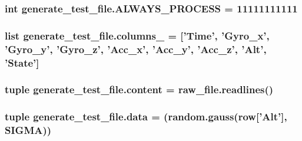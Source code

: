 \hypertarget{namespacegenerate__test__file_a063f15b4ec460755dbe0da62cdd3f591}{
\subsubsection[{A\-L\-W\-A\-Y\-S\-\_\-\-P\-R\-O\-C\-E\-S\-S}]{\setlength{\rightskip}{0pt plus 5cm}int generate\-\_\-test\-\_\-file.\-A\-L\-W\-A\-Y\-S\-\_\-\-P\-R\-O\-C\-E\-S\-S = 11111111111}}\label{namespacegenerate__test__file_a063f15b4ec460755dbe0da62cdd3f591}
\hypertarget{namespacegenerate__test__file_a5c7135c9c0c283f7b8f63639d0097702}{
\subsubsection[{columns\-\_\-}]{\setlength{\rightskip}{0pt plus 5cm}list generate\-\_\-test\-\_\-file.\-columns\-\_\- = \mbox{[}'Time', 'Gyro\-\_\-x', 'Gyro\-\_\-y', 'Gyro\-\_\-z', 'Acc\-\_\-x', 'Acc\-\_\-y', 'Acc\-\_\-z', 'Alt', 'State'\mbox{]}}}\label{namespacegenerate__test__file_a5c7135c9c0c283f7b8f63639d0097702}
\hypertarget{namespacegenerate__test__file_a524c28ccabc9eaefc102531d413e46c3}{
\subsubsection[{content}]{\setlength{\rightskip}{0pt plus 5cm}tuple generate\-\_\-test\-\_\-file.\-content = raw\-\_\-file.\-readlines()}}\label{namespacegenerate__test__file_a524c28ccabc9eaefc102531d413e46c3}
\hypertarget{namespacegenerate__test__file_aa8c6ec31362d28e7d223946dd31a6f19}{
\subsubsection[{data}]{\setlength{\rightskip}{0pt plus 5cm}tuple generate\-\_\-test\-\_\-file.\-data = (random.\-gauss(row\mbox{[}'Alt'\mbox{]}, {\bf S\-I\-G\-M\-A}))}}\label{namespacegenerate__test__file_aa8c6ec31362d28e7d223946dd31a6f19}
